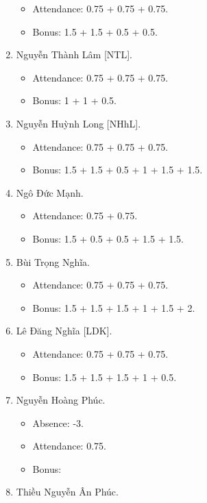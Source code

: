 \documentclass{article}
\begin{document}
\begin{enumerate}
    \begin{itemize}
        \item Attendance: 0.75 + 0.75 + 0.75.
        \item Bonus: 1.5 + 1.5 + 0.5 + 0.5.
    \end{itemize}
    \item {\sc Nguyễn Thành Lâm [NTL].}
    \begin{itemize}
        \item Attendance: 0.75 + 0.75 + 0.75.
        \item Bonus: 1 + 1 + 0.5.
    \end{itemize}
    \item {\sc Nguyễn Huỳnh Long [NHhL].}
    \begin{itemize}
        \item Attendance: 0.75 + 0.75 + 0.75.
        \item Bonus: 1.5 + 1.5 + 0.5 + 1 + 1.5 + 1.5.
    \end{itemize}
    \item {\sc Ngô Đức Mạnh.}
    \begin{itemize}
        \item Attendance: 0.75 + 0.75.
        \item Bonus: 1.5 + 0.5 + 0.5 + 1.5 + 1.5.
    \end{itemize}
    \item {\sc Bùi Trọng Nghĩa.}
    \begin{itemize}
        \item Attendance: 0.75 + 0.75 + 0.75.
        \item Bonus: 1.5 + 1.5 + 1.5 + 1 + 1.5 + 2.
    \end{itemize}
    \item {\sc Lê Đăng Nghĩa [LDK].}
    \begin{itemize}
        \item Attendance: 0.75 + 0.75 + 0.75.
        \item Bonus: 1.5 + 1.5 + 1.5 + 1 + 0.5.
    \end{itemize}
    \item {\sc Nguyễn Hoàng Phúc.}
    \begin{itemize}
        \item Absence: -3.
        \item Attendance: 0.75.
        \item Bonus:
    \end{itemize}
    \item {\sc Thiều Nguyễn Ân Phúc.}
    \begin{itemize}

\end{itemize}
\end{enumerate}
\end{document}

